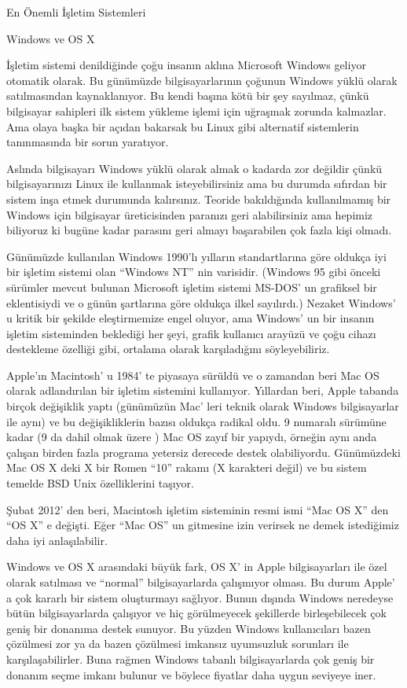 \documentclass[10pt,a5paper]{book}
\begin{document}
\begin{section}{En Önemli İşletim Sistemleri}
\begin{subsection}{Windows ve OS X}

İşletim sistemi denildiğinde çoğu insanın aklına Microsoft Windows geliyor otomatik olarak. Bu günümüzde bilgisayarlarının çoğunun Windows yüklü olarak satılmasından kaynaklanıyor. Bu kendi başına kötü bir şey sayılmaz, çünkü bilgisayar sahipleri ilk sistem yükleme işlemi için uğraşmak zorunda kalmazlar. Ama olaya başka bir açıdan bakarsak bu Linux gibi alternatif sistemlerin tanınmasında bir sorun yaratıyor.

Aslında bilgisayarı Windows yüklü olarak almak o kadarda zor değildir çünkü bilgisayarınızı Linux ile kullanmak isteyebilirsiniz ama bu durumda sıfırdan bir sistem inşa etmek durumunda kalırsınız. Teoride bakıldığında kullanılmamış bir Windows için bilgisayar üreticisinden paranızı geri alabilirsiniz ama hepimiz biliyoruz ki bugüne kadar parasını geri almayı başarabilen çok fazla kişi olmadı.

Günümüzde kullanılan Windows 1990'lı yılların standartlarına göre oldukça iyi bir işletim sistemi olan “Windows NT” nin  varisidir. (Windows 95 gibi önceki sürümler mevcut bulunan Microsoft işletim sistemi MS-DOS' un grafiksel bir eklentisiydi ve o günün şartlarına göre oldukça ilkel sayılırdı.) Nezaket Windows' u kritik bir şekilde eleştirmemize engel oluyor, ama Windows' un bir insanın işletim sisteminden beklediği her şeyi, grafik kullanıcı arayüzü ve çoğu cihazı destekleme özelliği gibi, ortalama olarak karşıladığını söyleyebiliriz.

Apple’ın Macintosh' u 1984' te piyasaya sürüldü ve o zamandan beri Mac OS olarak adlandırılan bir işletim sistemini kullanıyor. Yıllardan beri, Apple tabanda birçok değişiklik yaptı (günümüzün Mac' leri teknik olarak Windows bilgisayarlar ile aynı) ve bu değişikliklerin bazısı oldukça radikal oldu. 9 numaralı sürümüne kadar (9 da dahil olmak üzere ) Mac OS zayıf bir yapıydı, örneğin aynı anda çalışan birden fazla programa yetersiz derecede destek olabiliyordu. Günümüzdeki Mac OS X deki X bir Romen “10” rakamı (X karakteri değil) ve bu sistem temelde BSD Unix özelliklerini taşıyor.

Şubat 2012' den beri, Macintosh işletim sisteminin resmi ismi “Mac OS X” den “OS X” e değişti. Eğer “Mac OS” un gitmesine izin verirsek ne demek istediğimiz daha iyi anlaşılabilir.

Windows ve OS X arasındaki büyük fark, OS X' in Apple bilgisayarları ile özel olarak satılması ve “normal” bilgisayarlarda çalışmıyor olması. Bu durum Apple' a çok kararlı bir sistem oluşturmayı sağlıyor. Bunun dışında Windows neredeyse bütün bilgisayarlarda çalışıyor ve hiç görülmeyecek şekillerde birleşebilecek çok geniş bir donanıma destek sunuyor. Bu yüzden Windows kullanıcıları bazen çözülmesi zor ya da bazen çözülmesi imkansız uyumsuzluk sorunları ile karşılaşabilirler.  Buna rağmen Windows tabanlı bilgisayarlarda çok geniş bir donanım seçme imkanı bulunur ve böylece fiyatlar daha uygun seviyeye iner.


\end{subsection}
\end{section}
\end{document}
